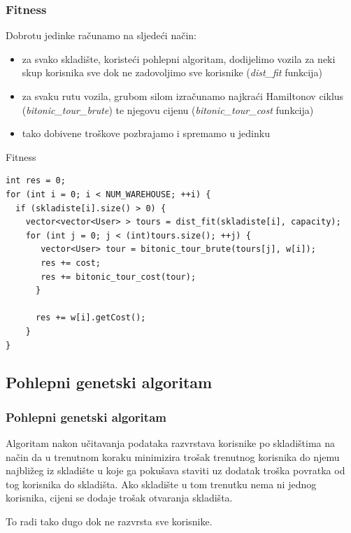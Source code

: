 \documentclass[utf8]{beamer}
\begin{document}
\begin{frame}
\frametitle{Fitness}

Dobrotu jedinke računamo na sljedeći način:
\begin{itemize}
  \item za svako skladište, koristeći pohlepni algoritam, dodijelimo vozila za neki skup korisnika sve dok ne zadovoljimo sve korisnike (\textit{dist\_fit} funkcija)
  
  \item za svaku rutu vozila, grubom silom izračunamo najkraći Hamiltonov ciklus (\textit{bitonic\_tour\_brute}) te njegovu cijenu (\textit{bitonic\_tour\_cost} funkcija)
  
  \item tako dobivene troškove pozbrajamo i spremamo u jedinku
\end{itemize}

\end{frame}

\begin{frame}[fragile]{Fitness}
\begin{lstlisting}
int res = 0;
for (int i = 0; i < NUM_WAREHOUSE; ++i) {
  if (skladiste[i].size() > 0) {
    vector<vector<User> > tours = dist_fit(skladiste[i], capacity);
    for (int j = 0; j < (int)tours.size(); ++j) {
       vector<User> tour = bitonic_tour_brute(tours[j], w[i]);
       res += cost;
       res += bitonic_tour_cost(tour);
      }
        
      res += w[i].getCost();
    }
}
\end{lstlisting}
\end{frame}

\subsection{Pohlepni genetski algoritam}
\begin{frame}
\frametitle{Pohlepni genetski algoritam}

Algoritam nakon učitavanja podataka razvrstava korisnike po skladištima na način da u trenutnom koraku minimizira trošak trenutnog korisnika do njemu najbližeg iz skladište u koje ga pokušava staviti uz dodatak troška povratka od tog korisnika do skladišta. Ako skladište u tom trenutku nema ni jednog korisnika, cijeni se dodaje trošak otvaranja skladišta.

\vspace{5mm}

To radi tako dugo dok ne razvrsta sve korisnike.

\end{frame}
\end{document}
